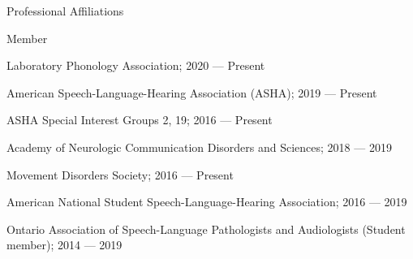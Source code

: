 \documentclass{resume} %
\begin{document}
\begin{rSection}{Professional Affiliations}
\begin{rSubsection}{Member}{}{}{}
	\item Laboratory Phonology Association; 2020 --- Present
	\item American Speech-Language-Hearing Association (ASHA); 2019 --- Present
	\item ASHA Special Interest Groups 2, 19; 2016 --- Present
	\item Academy of Neurologic Communication Disorders and Sciences; 2018 --- 2019
	\item Movement Disorders Society; 2016 --- Present
	\item American National Student Speech-Language-Hearing Association; 2016 --- 2019
	\item Ontario Association of Speech-Language Pathologists and Audiologists (Student member); 2014 --- 2019
\end{rSubsection}


\end{rSection}
\end{document}
